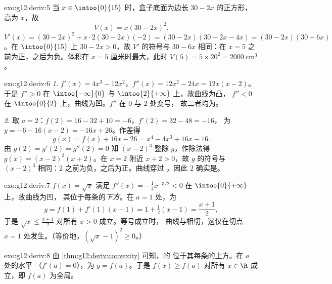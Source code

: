 \begin{solution}{exo:g12:deriv:5}
当 $x \in \intoo{0}{15}$ 时，盒子底面为边长 $30 - 2x$ 的正方形，
高为 $x$，故
\[
V(x) = x(30 - 2x)^2 .
\]
$V'(x) = (30-2x)^2 + x \cdot 2(30-2x)(-2) = (30-2x)(30 - 2x - 4x)
= (30-2x)(30-6x)$。在 $\intoo{0}{15}$ 上 $30 - 2x > 0$，故 $V'$ 的符号与
$30 - 6x$ 相同：在 $x = 5$ 之前为正，之后为负。体积在
$x = 5$ 厘米时最大，此时 $V(5) = 5 \times 20^2 = 2000\ \text{cm}^3$。
\end{solution}

\begin{solution}{exo:g12:deriv:6}
\emph{1.} $f'(x) = 4x^3 - 12x^2$，$f''(x) = 12x^2 - 24x = 12x(x-2)$。
于是 $f'' > 0$ 在 $\intoo{-\infty}{0}$ 与 $\intoo{2}{+\infty}$ 上，故曲线为凸，
$f'' < 0$ 在 $\intoo{0}{2}$ 上，曲线为凹。$f''$ 在 $0$ 与 $2$ 处变号，
故二者均为。

\emph{2.} 取 $a = 2$：$f(2) = 16 - 32 + 10 = -6$，$f'(2) = 32 - 48 = -16$，
为 $y = -6 - 16(x-2) = -16x + 26$。作差得
\[
g(x) = f(x) + 16x - 26 = x^4 - 4x^3 + 16x - 16 .
\]
由 $g(2) = g'(2) = g''(2) = 0$ 知 $(x-2)^3$ 整除 $g$，作除法得
$g(x) = (x-2)^3(x+2)$。在 $x = 2$ 附近 $x + 2 > 0$，故 $g$ 的符号与
$(x-2)^3$ 相同：$2$ 之前为负，之后为正。曲线穿过
，因此 $2$ 确实是。
\end{solution}

\begin{solution}{exo:g12:deriv:7}
 $f(x) = \sqrt{x}$ 满足
$f''(x) = -\frac{1}{4}x^{-3/2} < 0$ 在 $\intoo{0}{+\infty}$ 上，故曲线为凹，
其位于每条的\emph{下方}。在 $a = 1$ 处，为
\[
y = f(1) + f'(1)(x - 1) = 1 + \tfrac12 (x-1) = \frac{x+1}{2},
\]
于是 $\sqrt{x} \leq \frac{x+1}{2}$ 对所有 $x > 0$ 成立。等号成立时，
曲线与相切，这仅在切点
$x = 1$ 处发生。（等价地，$\left(\sqrt x - 1\right)^2 \geq 0$。）
\end{solution}

\begin{solution}{exo:g12:deriv:8}
由 \cref{thm:g12:deriv:convexity} 可知，的
位于其每条的上方。在 $a$ 处的水平
（$f'(a) = 0$），为 $y = f(a)$。于是 $f(x) \geq f(a)$ 对所有
$x \in \R$ 成立，即 $f(a)$ 为全局。
\end{solution}


